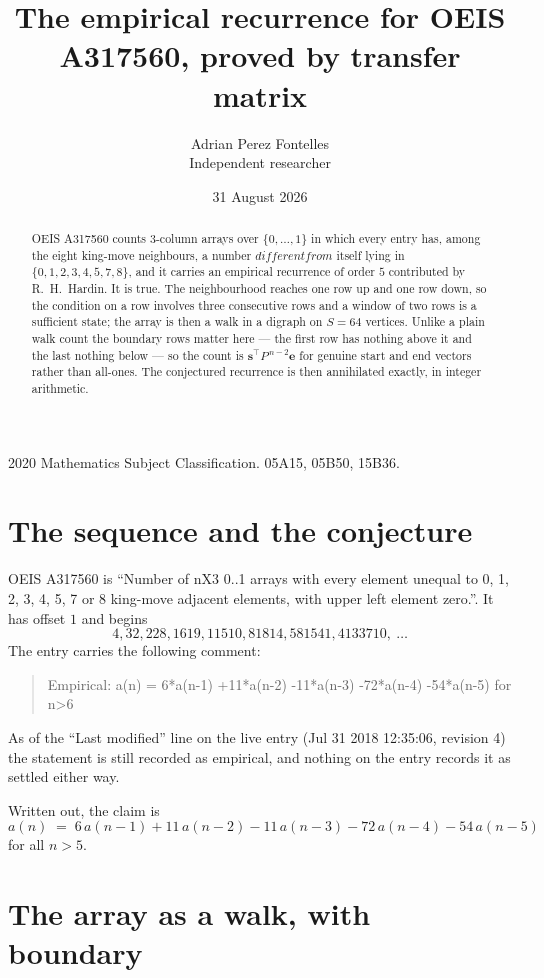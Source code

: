 \documentclass[11pt,a4paper]{article}
\title{The empirical recurrence for OEIS A317560, proved by transfer matrix}
\author{Adrian Perez Fontelles\\ \small Independent researcher}
\date{31 August 2026}
\theoremstyle{plain}
\theoremstyle{definition}
\begin{document}
\maketitle

\begin{abstract}
OEIS A317560 counts $3$-column arrays over $\{0,\dots,1\}$ in which every entry has,
among the eight king-move neighbours, a number $different from$ itself lying in $\{0,1,2,3,4,5,7,8\}$, and it carries an empirical
recurrence of order $5$ contributed by R.~H.~Hardin. It is true. The neighbourhood
reaches one row up and one row down, so the condition on a row involves three consecutive
rows and a window of two rows is a sufficient state; the array is then a walk in a digraph
on $S=64$ vertices. Unlike a plain walk count the boundary rows matter here --- the first
row has nothing above it and the last nothing below --- so the count is
$\mathbf{s}^{\!\top}P^{\,n-2}\mathbf{e}$ for genuine start and end vectors rather than
all-ones. The conjectured recurrence is then annihilated exactly, in integer arithmetic.
\end{abstract}

\noindent\small 2020 Mathematics Subject Classification. 05A15, 05B50, 15B36.\normalsize

\section{The sequence and the conjecture}

OEIS A317560 is ``Number of nX3 0..1 arrays with every element unequal to 0, 1, 2, 3, 4, 5, 7 or 8 king-move adjacent elements, with upper left element zero.''. It has offset
$1$ and begins
\[
4, 32, 228, 1619, 11510, 81814, 581541, 4133710,\ \dots
\]
The entry carries the following comment:
\begin{quote}\small
Empirical: a(n) = 6*a(n-1) +11*a(n-2) -11*a(n-3) -72*a(n-4) -54*a(n-5) for n>6
\end{quote}
As of the ``Last modified'' line on the live entry (Jul 31 2018 12:35:06, revision
4) the statement is still recorded as empirical, and nothing on the entry
records it as settled either way.

Written out, the claim is
\begin{equation}\label{eq:conj}
a(n)\;=\;6\,a(n-1) + 11\,a(n-2) - 11\,a(n-3) - 72\,a(n-4) - 54\,a(n-5)
\end{equation}
for all $n>5$.

\section{The array as a walk, with boundary}
\end{document}
